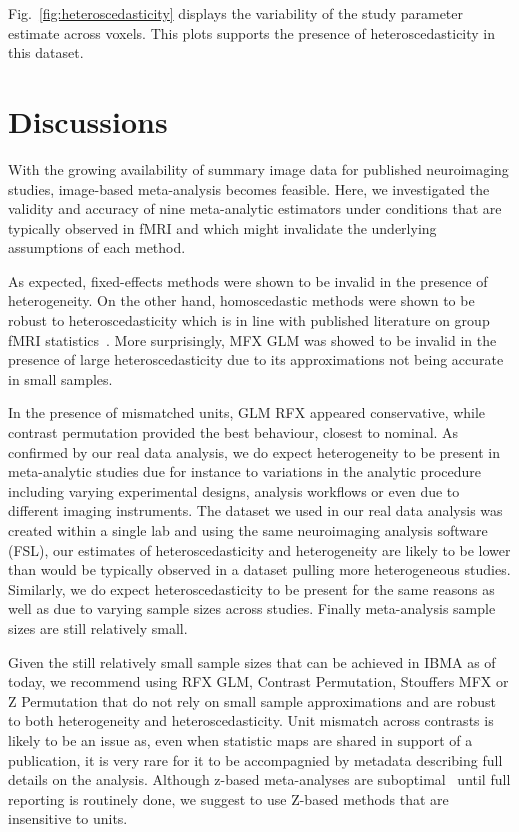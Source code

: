 \documentclass[preprint]{elsarticle}
\begin{document}
Fig.~\ref{fig:heteroscedasticity} displays the variability of the study parameter estimate across voxels. This plots supports the presence of heteroscedasticity in this dataset.

\section{Discussions}\label{sec:discussion}    
With the growing availability of summary image data for published neuroimaging studies, image-based meta-analysis becomes feasible. Here, we investigated the validity and accuracy of nine meta-analytic estimators under conditions that are typically observed in fMRI and which might invalidate the underlying assumptions of each method.

As expected, fixed-effects methods were shown to be invalid in the presence of heterogeneity. On the other hand, homoscedastic methods were shown to be robust to heteroscedasticity which is in line with published literature on group fMRI statistics~\cite{Mumford2009}. More surprisingly, MFX GLM was showed to be invalid in the presence of large heteroscedasticity due to its approximations not being accurate in small samples. 

In the presence of mismatched units, GLM RFX appeared conservative, while contrast permutation provided the best behaviour, closest to nominal. 
As confirmed by our real data analysis, we do expect heterogeneity to be present in meta-analytic studies due for instance to variations in the analytic procedure including varying experimental designs, analysis workflows or even due to different imaging instruments. The dataset we used in our real data analysis was created within a single lab and using the same neuroimaging analysis software (FSL), our estimates of heteroscedasticity and heterogeneity are likely to be lower than would be typically observed in a dataset pulling more heterogeneous studies. Similarly, we do expect heteroscedasticity to be present for the same reasons as well as due to varying sample sizes across studies. Finally meta-analysis sample sizes are still relatively small. 

Given the still relatively small sample sizes that can be achieved in IBMA as of today, we recommend using RFX GLM, Contrast Permutation, Stouffers MFX or Z Permutation that do not rely on small sample approximations and are robust to both heterogeneity and heteroscedasticity. Unit mismatch across contrasts is likely to be an issue as, even when statistic maps are shared in support of a publication, it is very rare for it to be accompagnied by metadata describing full details on the analysis. Although z-based meta-analyses are suboptimal~\cite{Cummings2004} until full reporting is routinely done, we suggest to use Z-based methods that are insensitive to units. 
\end{document}
